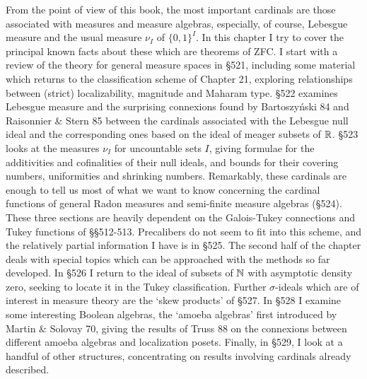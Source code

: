 \loadeusm\loadeurm
\Loadfourteens
{}

 
  
  
\smallprint  
\usegraphicx
  
\Extract  
  

 
\def\chaptername{Cardinal functions of measure theory} 
 
 
From the point of view of this book, the most important cardinals are 
those associated with measures and measure algebras, especially, of 
course, Lebesgue measure and the usual measure $\nu_I$ of $\{0,1\}^I$. 
In this 
chapter I try to cover the principal known facts about these which are 
theorems of ZFC.   I start with a review of the theory for general measure 
spaces in \S521,  
including some material which returns to the classification 
scheme of Chapter 21, exploring relationships between (strict) 
localizability, magnitude and Maharam type.    
\S522 examines Lebesgue measure and the surprising 
connexions found by {\smc Bartoszy\'nski 84} and 
{\smc Raisonnier \& Stern 85} between the cardinals associated with the 
Lebesgue null 
ideal and the corresponding ones based on the ideal of meager subsets of 
$\Bbb R$.   \S523 looks at the 
measures $\nu_I$ for uncountable sets $I$, giving formulae for the 
additivities and cofinalities of their null ideals, and bounds for 
their covering numbers, uniformities and shrinking numbers.    
Remarkably, these cardinals 
are enough to tell us most of what we want to know concerning the 
cardinal functions of general Radon measures and semi-finite measure 
algebras (\S524).   These three sections are heavily dependent on the 
Galois-Tukey connections and Tukey functions of \S\S512-513.    
Precalibers do 
not seem to fit into this scheme, and the relatively partial information 
I have is in \S525.   The second half of the chapter deals with special 
topics which can be approached with the methods so far developed.    
In \S526 I return to the ideal of subsets of $\Bbb N$ 
with asymptotic density zero, seeking to locate it in the Tukey 
classification.   Further $\sigma$-ideals which are of interest in 
measure theory are the `skew products' of \S527.    
In \S528 I examine some interesting 
Boolean algebras, the `amoeba algebras' first introduced by 
{\smc Martin \& Solovay 70}, giving the results of {\smc Truss 88} 
on the connexions 
between different amoeba algebras and localization posets.   Finally, 
in \S529, I look at a handful of other structures, concentrating on 
results involving cardinals already described. 
 

